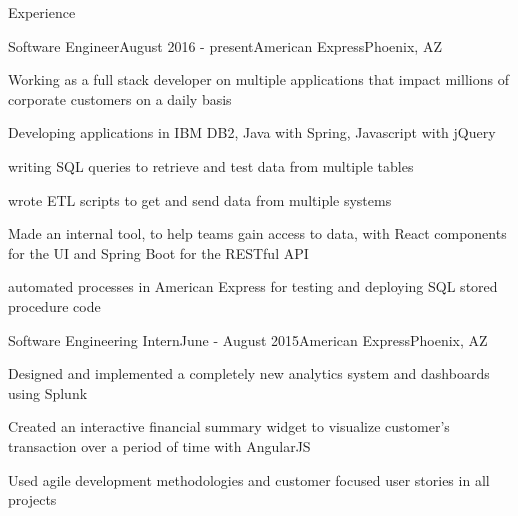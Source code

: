 \documentclass{resume} %
\begin{document}
\begin{rSection}{Experience}

\begin{rSubsection}{Software Engineer}{August 2016 - present}{American Express}{Phoenix, AZ}
\item Working as a full stack developer on multiple applications that impact millions of corporate customers on a daily basis
\item Developing applications in IBM DB2, Java with Spring, Javascript with jQuery
\item writing SQL queries to retrieve and test data from multiple tables
\item wrote ETL scripts to get and send data from multiple systems
\item Made an internal tool, to help teams gain access to data, with React components for the UI and Spring Boot for the RESTful API
\item automated processes in American Express for testing and deploying SQL stored procedure code
\end{rSubsection}

\begin{rSubsection}{Software Engineering Intern}{June - August 2015}{American Express}{Phoenix, AZ}
\item Designed and implemented a completely new analytics system and dashboards using Splunk 
\item Created an interactive financial summary widget  to visualize customer's transaction over a period of time with AngularJS
\item Used agile development methodologies and customer focused user stories in all projects
\end{rSubsection}

\end{rSection}
\end{document}
